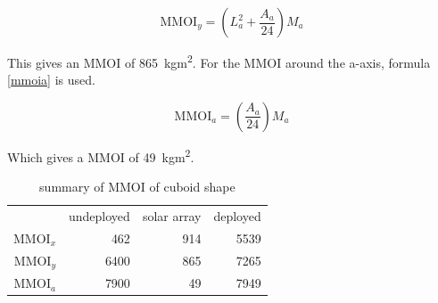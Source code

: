 \begin{equation}
  \label{mmoiy}
  \mathrm{MMOI}_y=\left(L_a^2+\frac{A_a}{24}\right)M_a
\end{equation}

This gives an MMOI of \SI{865}{kgm^2}.  For the MMOI around the
a-axis, formula \ref{mmoia} is used.

\begin{equation}
  \label{mmoia}
  \mathrm{MMOI}_a=\left(\frac{A_a}{24}\right)M_a
\end{equation}

Which gives a MMOI of \SI{49}{kgm^2}.

\begin{longtable}{rrrr}
\caption{summary of MMOI of cuboid shape} \\
 & undeployed & solar array & deployed \\
 MMOI$_x$ & 462 & 914 & 5539 \\
 MMOI$_y$ & 6400 & 865 & 7265 \\
 MMOI$_a$ & 7900 & 49 & 7949 \\
\end{longtable}
